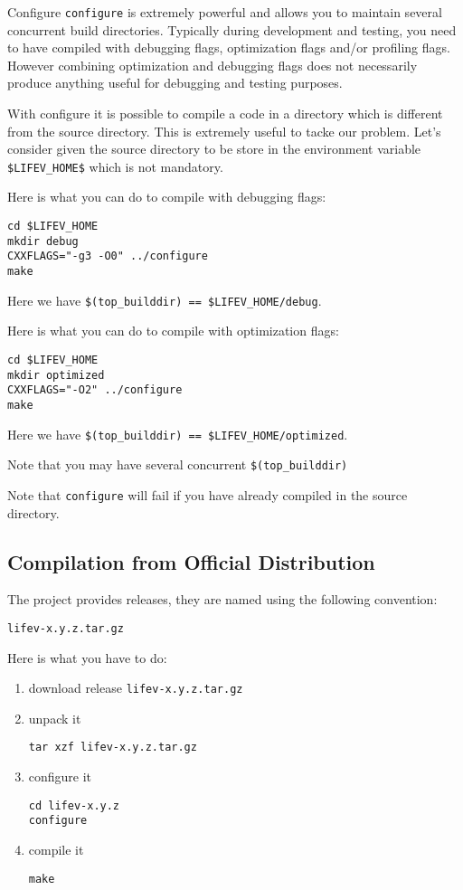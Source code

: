 \begin{hint}{Configure}
  \label{hint:configure}
  \verb!configure! is extremely powerful and allows you to maintain
  several concurrent build directories. Typically during development
  and testing, you need to have \lifev compiled with debugging flags,
  optimization flags and/or profiling flags. However combining
  optimization and debugging flags does not necessarily produce
  anything useful for debugging and testing purposes.
  
  With configure it is possible to compile a code in a directory which
  is different from the source directory. This is extremely useful to
  tacke our problem. Let's consider given the source directory to be
  store in the environment variable \verb!$LIFEV_HOME$! which is not
  mandatory.

Here is what you can do to compile with debugging flags:
\begin{verbatim}
cd $LIFEV_HOME 
mkdir debug
CXXFLAGS="-g3 -O0" ../configure
make
\end{verbatim}
Here we have \verb+$(top_builddir) == $LIFEV_HOME/debug+.

Here is what you can do to compile with optimization flags:
\begin{verbatim}
cd $LIFEV_HOME
mkdir optimized
CXXFLAGS="-O2" ../configure
make
\end{verbatim}
Here we have \verb+$(top_builddir) == $LIFEV_HOME/optimized+.

\noindent Note that you may have several concurrent \verb+$(top_builddir)+

\noindent Note that \verb!configure! will fail if you have already compiled
\lifev in the source directory. 


\end{hint}


\subsection{Compilation from Official Distribution}

The \lifev project provides releases, they are named using the following convention:
\begin{center}
\verb!lifev-x.y.z.tar.gz!
\end{center}

Here is what you have to do:

\begin{enumerate}
\item download \lifev release \verb!lifev-x.y.z.tar.gz!
\item unpack it
\begin{verbatim}
tar xzf lifev-x.y.z.tar.gz
\end{verbatim}
\item configure it
\begin{verbatim}
cd lifev-x.y.z
configure
\end{verbatim}
\item compile it
\begin{verbatim}
make
\end{verbatim}
\end{enumerate}

